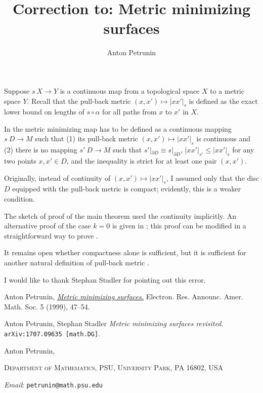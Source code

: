 \documentclass{article}
\begin{document}
\title{Correction to: Metric minimizing surfaces}
\author{Anton Petrunin}

\newcommand{\Addresses}{{\bigskip\footnotesize
Anton Petrunin, \par\nopagebreak\textsc{Department of Mathematics, PSU, University Park, PA 16802, USA}
\par\nopagebreak
\textit{Email}: \texttt{petrunin@math.psu.edu}
}}

\date{}

\maketitle

Suppose $s\: X\to Y$ is a continuous map from a topological space $X$ to a metric space $Y$.
Recall that the pull-back metric $(x,x')\mapsto |xx'|_s$ is defined as the exact lower bound on lengths of $s\circ\alpha$ for all paths from $x$ to $x'$ in $X$.

In \cite{petrunin-metric-min} the metric minimizing map has to be defined as 
a continuous mapping $s\: D \to M$ such that (1) its pull-back metric $(x,x')\mapsto |xx'|_s$ is continuous and (2) there is no mapping $s'\: D \to M$ such that
$s'|_{\partial D} \equiv s|_{\partial D}$, $|xx'|_{s'} \le |xx' |_s$ for any two points $x, x' \in D$, and the inequality is strict for at least one pair $(x,x')$.

Originally, instead of continuity of $(x,x')\mapsto |xx'|_s$, I assumed only that the disc $D$ equipped with the pull-back metric is compact;
evidently, this is a weaker condition.

The sketch of proof of the main theorem \cite[2.2]{petrunin-metric-min} used the continuity implicitly.
An alternative proof of the case $k=0$ is given in \cite[9.2]{petrunin-stadler};
this proof can be modified in a straightforward way to prove \cite[2.2]{petrunin-metric-min}.

It remains open whether compactness alone is sufficient,
but it is sufficient for another natural definition of pull-back metric \cite[9.1]{petrunin-stadler}.

I would like to thank Stephan Stadler for pointing out this error.

\begin{thebibliography}{52}

 Anton Petrunin,
\href{https://www.ams.org/journals/era/1999-05-07/S1079-6762-99-00059-1/}{\textit{Metric minimizing surfaces.}}
Electron. Res. Announc. Amer. Math. Soc. 5 (1999), 47--54.

 Anton Petrunin, Stephan Stadler
\textit{Metric minimizing surfaces revisited.} 
\texttt{arXiv:1707.09635 [math.DG]}.


\end{thebibliography}

\Addresses
\end{document}
